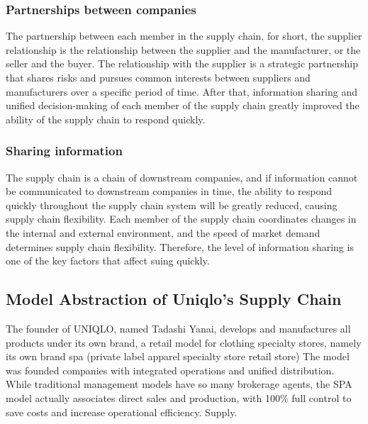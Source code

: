 \documentclass[12pt,]{article}
\begin{document}
\hypertarget{partnerships-between-companies}{%
\subsubsection{Partnerships between
companies}\label{partnerships-between-companies}}

The partnership between each member in the supply chain, for short, the
supplier relationship is the relationship between the supplier and the
manufacturer, or the seller and the buyer. The relationship with the
supplier is a strategic partnership that shares risks and pursues common
interests between suppliers and manufacturers over a specific period of
time. After that, information sharing and unified decision-making of
each member of the supply chain greatly improved the ability of the
supply chain to respond quickly.

\hypertarget{sharing-information}{%
\subsubsection{Sharing information}\label{sharing-information}}

The supply chain is a chain of downstream companies, and if information
cannot be communicated to downstream companies in time, the ability to
respond quickly throughout the supply chain system will be greatly
reduced, causing supply chain flexibility. Each member of the supply
chain coordinates changes in the internal and external environment, and
the speed of market demand determines supply chain flexibility.
Therefore, the level of information sharing is one of the key factors
that affect suing quickly.

\hypertarget{model-abstraction-of-uniqlos-supply-chain}{%
\subsection{Model Abstraction of Uniqlo's Supply
Chain}\label{model-abstraction-of-uniqlos-supply-chain}}

The founder of UNIQLO, named Tadashi Yanai, develops and manufactures
all products under its own brand, a retail model for clothing specialty
stores, namely its own brand spa (private label apparel specialty store
retail store) The model was founded companies with integrated operations
and unified distribution. While traditional management models have so
many brokerage agents, the SPA model actually associates direct sales
and production, with 100\% full control to save costs and increase
operational efficiency. Supply.
\end{document}
